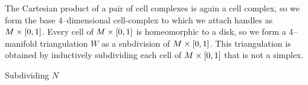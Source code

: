 The Cartesian product of a pair of cell complexes is again a cell complex, so we form the base 4--dimensional cell-complex to which we attach handles as $M\times[0,1]$.
Every cell of $M\times[0,1]$ is homeomorphic to a disk, so we form a 4--manifold triangulation $W$ as a subdivision of $M\times[0,1]$.
This triangulation is obtained by inductively subdividing each cell of $M\times[0,1]$ that is not a simplex.

\begin{algorithm}[h!]
	\caption{Subdividing $N$}
	\label{alg:subdividing-manifold}
\end{algorithm}

%
%
%
%
%
%
%
%
